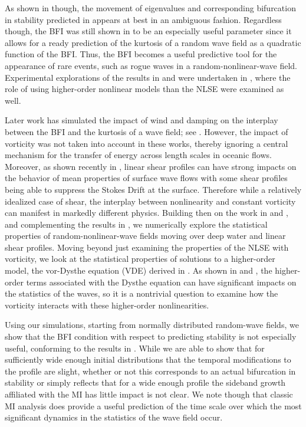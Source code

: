 \documentclass[a4paper,11pt]{article}
\begin{document}
As shown in \cite{janssen} though, the movement of eigenvalues and corresponding bifurcation in stability predicted in \cite{alber} appears at best in an ambiguous fashion.  Regardless though, the BFI was still shown in \cite{janssen} to be an especially useful parameter since it allows for a ready prediction of the kurtosis of a random wave field as a quadratic function of the BFI.  Thus, the BFI becomes a useful predictive tool for the appearance of rare events, such as rogue waves in a random-nonlinear-wave field.  Experimental explorations of the results in \cite{janssen} and \cite{alber} were undertaken in \cite{onorato}, where the role of using higher-order nonlinear models than the NLSE were examined as well.  

Later work has simulated the impact of wind and damping on the interplay between the BFI and the kurtosis of a wave field; see \cite{slunyaev,eeltink}.  However, the impact of vorticity was not taken into account in these works, thereby ignoring a central mechanism for the transfer of energy across length scales in oceanic flows.  Moreover, as shown recently in \cite{curtis8}, linear shear profiles can have strong impacts on the behavior of mean properties of surface wave flows with some shear profiles being able to suppress the Stokes Drift at the surface.  Therefore while a relatively idealized case of shear, the interplay between nonlinearity and constant vorticity can manifest in markedly different physics.  Building then on the work in \cite{thomas2012nonlinear} and \cite{curtis8}, and complementing the results in \cite{touboul}, we numerically explore the statistical properties of random-nonlinear-wave fields moving over deep water and linear shear profiles.  Moving beyond just examining the properties of the NLSE with vorticity, we look at the statistical properties of solutions to a higher-order model, the vor-Dysthe equation (VDE) derived in \cite{curtis8}.  As shown in \cite{onorato,janssen} and \cite{eeltink}, the higher-order terms associated with the Dysthe equation can have significant impacts on the statistics of the waves, so it is a nontrivial question to examine how the vorticity interacts with these higher-order nonlinearities.  

Using our simulations, starting from normally distributed random-wave fields, we show that the BFI condition with respect to predicting stability is not especially useful, conforming to the results in \cite{janssen}.  While we are able to show that for sufficiently wide enough initial distributions that the temporal modifications to the profile are slight, whether or not this corresponds to an actual bifurcation in stability or simply reflects that for a wide enough profile the sideband growth affiliated with the MI has little impact is not clear.  We note though that classic MI analysis does provide a useful prediction of the time scale over which the most significant dynamics in the statistics of the wave field occur.  
\end{document}
